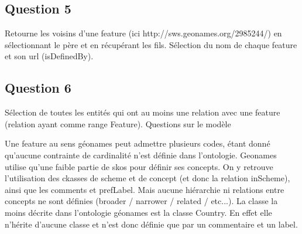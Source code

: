 \subsection{Question 5}
Retourne les voisins d'une feature (ici http://sws.geonames.org/2985244/) en sélectionnant le père et en récupérant les fils. Sélection du nom de chaque feature et son url (isDefinedBy).
\subsection{Question 6}
%
Sélection de toutes les entités qui ont au moins une relation avec une feature (relation ayant comme range Feature).
Questions sur le modèle

    Une feature au sens géonames peut admettre plusieurs codes, étant donné qu'aucune contrainte de cardinalité n'est définie dans l'ontologie.
    Geonames utilise qu'une faible partie de skos pour définir ses concepts. On y retrouve l'utilisation des ckasses de scheme et de concept (et donc la relation inScheme), ainsi que les comments et prefLabel. Mais aucune hiérarchie ni relations entre concepts ne sont définies (broader / narrower / related / etc...).
    La classe la moins décrite dans l'ontologie géonames est la classe Country. En effet elle n'hérite d'aucune classe et n'est donc définie que par un commentaire et un label.
